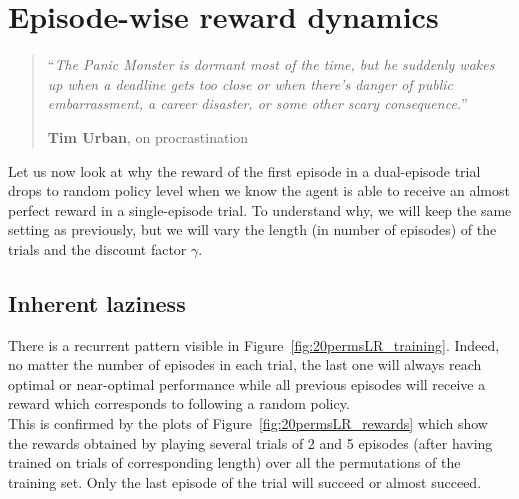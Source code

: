 \chapter{Episode-wise reward dynamics}
\label{chap:reward_structure}
\begin{quotation}
\noindent ``\emph{The Panic Monster is dormant most of the time, but he 
	suddenly wakes up when a deadline gets too close or when there's danger
	of public embarrassment, a career disaster, or some other scary 
	consequence.}''
\begin{flushright}\textbf{Tim Urban}, on procrastination\end{flushright}
\end{quotation}

Let us now look at why the reward of the first episode in a dual-episode
trial drops to random policy level when we know the agent is able to receive
an almost perfect reward in a single-episode trial. To understand why, we will
keep the same setting as previously, but
we will vary the length (in number of episodes) of the trials and the
discount factor $\gamma$.

\section{Inherent laziness}
There is a recurrent pattern visible in Figure~\ref{fig:20permsLR_training}.
Indeed, no matter the number of episodes in each trial, the last one will
always reach optimal or near-optimal performance while all previous episodes
will receive a reward which corresponds to following a random policy.\\

This is confirmed by the plots of Figure~\ref{fig:20permsLR_rewards} which
show the rewards obtained by playing several trials of 2 and 5 episodes
(after having trained on trials of corresponding length) over all the
permutations of the training set. Only the last episode of the trial will
succeed or almost succeed.\\

